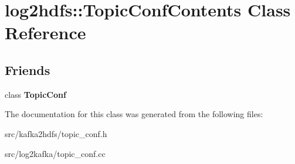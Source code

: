 \hypertarget{classlog2hdfs_1_1TopicConfContents}{}\section{log2hdfs\+:\+:Topic\+Conf\+Contents Class Reference}
\label{classlog2hdfs_1_1TopicConfContents}
\subsection*{Friends}
\begin{DoxyCompactItemize}
\item 
class {\bfseries Topic\+Conf}\hypertarget{classlog2hdfs_1_1TopicConfContents_a432de442344920ee94b6271ab4996c39}{}\label{classlog2hdfs_1_1TopicConfContents_a432de442344920ee94b6271ab4996c39}

\end{DoxyCompactItemize}


The documentation for this class was generated from the following files\+:\begin{DoxyCompactItemize}
\item 
src/kafka2hdfs/topic\+\_\+conf.\+h\item 
src/log2kafka/topic\+\_\+conf.\+cc\end{DoxyCompactItemize}
